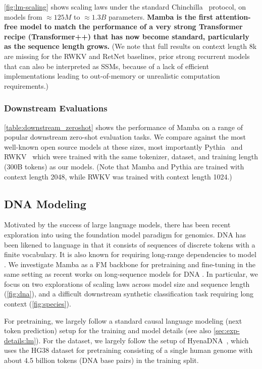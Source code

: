 \ref{fig:lm-scaling} shows scaling laws under the standard Chinchilla~\citep{hoffmann2022empirical} protocol, on models from $\approx 125M$ to $\approx 1.3B$ parameters.
\textbf{Mamba is the first attention-free model to match the performance of a very strong Transformer recipe (Transformer++) that has now become standard, particularly as the sequence length grows.} (We note that full results on context length 8k are missing for the RWKV and RetNet baselines, prior strong recurrent models that can also be interpreted as SSMs, because of a lack of efficient implementations leading to out-of-memory or unrealistic computation requirements.)

  \subsubsection{Downstream Evaluations}

\ref{table:downstream_zeroshot} shows the performance of Mamba on a range of popular downstream zero-shot evaluation tasks. We compare against the most well-known open source models at these sizes, most importantly Pythia~\citep{biderman2023pythia} and RWKV~\citep{peng2023rwkv} which were trained with the same tokenizer, dataset, and training length (300B tokens) as our models. (Note that Mamba and Pythia are trained with context length 2048, while RWKV was trained with context length 1024.)

\subsection{DNA Modeling}
\label{sec:exp:genomics}

Motivated by the success of large language models, there has been recent exploration into using the foundation model paradigm for genomics. DNA has been likened to language in that it consists of sequences of discrete tokens with a finite vocabulary. It is also known for requiring long-range dependencies to model \citep{avsec2021effective}.
We investigate Mamba as a FM backbone for pretraining and fine-tuning in the same setting as recent works on long-sequence models for DNA \citep{nguyen2023hyenadna}.
In particular, we focus on two explorations of scaling laws across model size and sequence length (\ref{fig:dna}), and a difficult downstream synthetic classification task requiring long context (\ref{fig:species}).

For pretraining, we largely follow a standard causal language modeling (next token prediction) setup for the training and model details (see also \ref{sec:exp-details:lm}).
For the dataset, we largely follow the setup of HyenaDNA~\citep{nguyen2023hyenadna}, which uses the HG38 dataset for pretraining consisting of a single human genome with about 4.5 billion tokens (DNA base pairs) in the training split.

